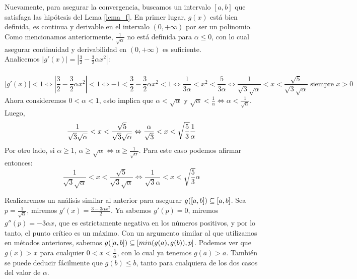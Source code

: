 Nuevamente, para asegurar la convergencia, buscamos un intervalo $[a,b]$ que satisfaga las hipótesis del Lema \ref{lema_f}.
  En primer lugar, $g(x)$ está bien definida, es continua y derivable en el intervalo $(0, +\infty)$ por ser un polinomio. Como mencionamos anteriormente, $\frac{1}{\sqrt{\alpha}}$ no está definida para $\alpha \leq 0$, con lo cual asegurar continuidad y derivabilidad en $(0,+\infty)$ es suficiente.\\
  
  Analicemos $|g'(x)| = |\frac{3}{2} - \frac{3}{2}\alpha x^2|$:\\\\
  $$
	 |g'(x)| < 1 
	 \Leftrightarrow |\frac{3}{2} - \frac{3}{2}\alpha x^2| < 1 
	 \Leftrightarrow -1 < \frac{3}{2} - \frac{3}{2}\alpha x^2 < 1
	 \Leftrightarrow \frac{1}{3\alpha} < x^2 < \frac{5}{3\alpha}
	 \Leftrightarrow \frac{1}{\sqrt{3}\sqrt{\alpha}} < x < \frac{\sqrt{5}}{\sqrt{3}\sqrt{\alpha}} \mbox{ siempre } x > 0
$$
  Ahora consideremos $0 < \alpha < 1$, esto implica que $\alpha < \sqrt{\alpha}$ y $\sqrt{\alpha} < \frac{1}{\alpha} \Leftrightarrow \alpha < \frac{1}{\sqrt{\alpha}}$.  Luego, 
$$      \frac{1}{\sqrt{3}\sqrt{\alpha}} < x < \frac{\sqrt{5}}{\sqrt{3}\sqrt{\alpha}} \Leftrightarrow \frac{\alpha}{\sqrt{3}} < x < \sqrt{\frac{5}{3}}\frac{1}{\alpha} \\
$$ 
  Por otro lado, si $\alpha \geq 1$, $\alpha \geq \sqrt{\alpha} \Leftrightarrow \alpha \geq \frac{1}{\sqrt{\alpha}}$. Para este caso podemos afirmar entonces:
	  $$	      \frac{1}{\sqrt{3}\sqrt{\alpha}} < x < \frac{\sqrt{5}}{\sqrt{3}\sqrt{\alpha}} \Leftrightarrow \frac{1}{\sqrt{3}\alpha} < x < \sqrt{\frac{5}{3}}\alpha $$
	  
Realizaremos un análisis similar al anterior para asegurar $g([a,b]) \subseteq [a,b]$. Sea $p = \frac{1}{\sqrt{\alpha}}$, miremos $g'(x) = \frac{3-3\alpha x^2}{2}$. Ya sabemos $g'(p) = 0$, miremos $g''(p) =  -3 \alpha x$, que es estrictamente negativa en los números positivos, y por lo tanto, el punto crítico es un máximo. Con un argumento similar al que utilizamos en métodos anteriores, sabemos $g([a,b]) \subseteq [min(g(a), g(b)), p]$. Podemos ver que $g(x) > x$ para cualquier $0<x<\frac{1}{\alpha}$, con lo cual ya tenemos $g(a) > a$. También se puede deducir fácilmente que $g(b) \leq b$, tanto para cualquiera de los dos casos del valor de $\alpha$.


